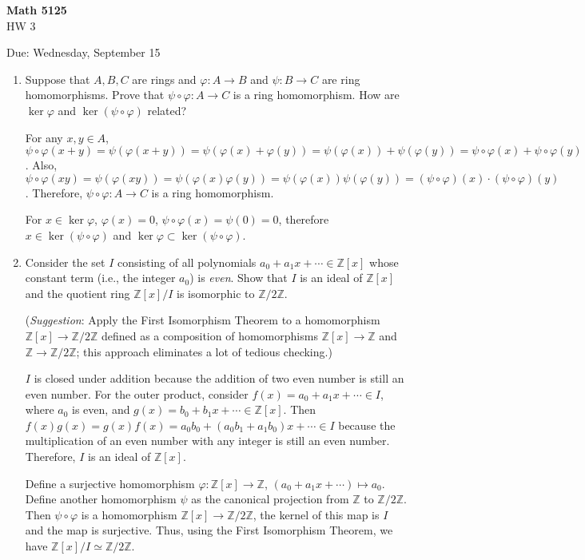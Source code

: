 \documentclass[12pt]{article}
\newcommand{\Z}{\mathbb{Z}}
\begin{document}
\begin{center}
{\bf Math 5125}\\
HW 3
\smallskip

Due: Wednesday, September 15
\end{center}

\begin{enumerate}

\item Suppose that $A,B,C$ are rings and $\varphi : A \to B$ and $\psi: B \to C$ are ring homomorphisms. Prove that $\psi\circ\varphi: A \to C$ is a ring homomorphism. How are $\ker \varphi$ and $\ker(\psi\circ\varphi)$ related?

For any $x,y \in A$, $\psi\circ\varphi(x + y) = \psi(\varphi(x+y)) = \psi(\varphi(x) + \varphi(y)) = \psi(\varphi(x)) + \psi(\varphi(y)) = \psi\circ\varphi(x) + \psi\circ\varphi(y)$. Also, $\psi\circ\varphi(xy) = \psi(\varphi(xy)) = \psi(\varphi(x) \varphi(y)) = \psi(\varphi(x)) \psi(\varphi(y)) = (\psi\circ\varphi)(x) \cdot (\psi\circ\varphi)(y)$. Therefore, $\psi \circ \varphi: A \to C$ is a ring homomorphism.

For $x \in \ker \varphi$,  $\varphi(x) = 0$, $\psi \circ \varphi (x) = \psi(0) = 0$, therefore $x \in \ker(\psi \circ \varphi)$ and $\ker \varphi \subset \ker(\psi \circ \varphi)$.

\newpage

\item Consider the set $I$ consisting of all polynomials $a_0+a_1x+\dotsm\in\Z[x]$ whose constant term (i.e., the integer $a_0$) is {\em even}. Show that $I$ is an ideal of $\Z[x]$ and the quotient ring $\Z[x]/I$ is isomorphic to $\Z/2\Z$.

({\em Suggestion}: Apply the First Isomorphism Theorem to a homomorphism $\Z[x]\to\Z/2\Z$ defined as a composition of homomorphisms $\Z[x]\to\Z$ and $\Z\to\Z/2\Z$; this approach eliminates a lot of tedious checking.)


$I$ is closed under addition because the addition of two even number is still an even number. For the outer product, consider $f(x) = a_0 + a_1 x + \cdots \in I$, where $a_0$ is even, and $g(x) = b_0 + b_1 x + \cdots \in \Z[x]$. Then $f(x)g(x) = g(x) f(x) = a_0 b_0 + (a_0 b_1 + a_1 b_0) x + \cdots \in I$ because the multiplication of an even number with any integer is still an even number. Therefore, $I$ is an ideal of $\Z[x]$.

Define a surjective homomorphism $\varphi: \Z[x] \to \Z$, $(a_0 + a_1 x + \cdots) \mapsto a_0$. Define another homomorphism $\psi$ as the canonical projection from $\Z$ to $\Z/2\Z$. Then $\psi \circ \varphi$ is a homomorphism $\Z[x] \to \Z/2\Z$, the kernel of this map is $I$ and the map is surjective. Thus, using the First Isomorphism Theorem, we have $\Z[x]/I \simeq \Z/2\Z$.



\end{enumerate}
\end{document}
